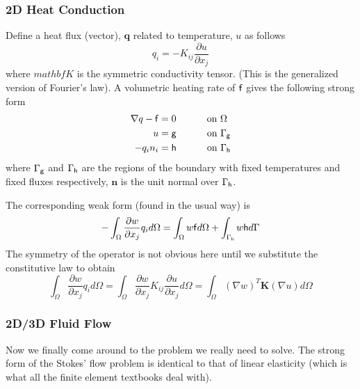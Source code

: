 \documentclass[10pt]{article}
\newcommand{\curly}{\sf }
\begin{document}
	\subsubsection{2D Heat Conduction}
	Define a heat flux (vector), $\mathbf{q}$ related to temperature, $u$ as 	follows
		\begin{equation}
			q_i = -K_{ij} \frac{\partial u}{\partial x_j}
		\end{equation}
	where $mathbf{K}$ is the symmetric conductivity tensor. (This is 
	the generalized version of Fourier's law). A volumetric heating rate of $\curly f$ 
	gives the following strong form
		\begin{equation}
			\begin{split}
				\nabla q - {\curly f} &= 0  \mbox{\hspace{1cm} on $\Omega$} \\
				u & = {\curly g} \mbox{\hspace{1cm} on $\Gamma_{\curly g}$} \\
				-q_i n_i &= {\curly h} \mbox{\hspace{1cm} on $\Gamma_{\curly h}$}
			\end{split}
		\end{equation}
	where $\Gamma_ {\curly g}$ and $\Gamma_{\curly h}$ are the regions of the boundary
	with fixed temperatures and fixed fluxes respectively, $\mathbf{n}$ is the unit normal
	over $\Gamma_{\curly h}$.
	
	The corresponding weak form (found in the usual way) is 
		\begin{equation}
			-\int_\Omega  \frac{\partial w}{\partial x_j} q_i d\Omega = \int_\Omega w {\curly f} d\Omega + \int_{\Gamma_{\curly h}} w{\curly h} d\Gamma
		\end{equation}
	The symmetry of the operator is not obvious here until we substitute the constitutive law to obtain
		\begin{equation}
			\int_\Omega  \frac{\partial w}{\partial x_j} q_i d\Omega =
			 \int_\Omega  \frac{\partial w}{\partial x_j} K_{ij} \frac{\partial u}{\partial x_j} d\Omega = 
			 \int_\Omega  (\nabla w)^T \mathbf{K} (\nabla u) d\Omega
		\end{equation}
		
	\subsubsection{2D/3D Fluid Flow}
	Now we finally come around to the problem we really need to solve.
	The strong form of the Stokes' flow problem is identical to that
	of linear elasticity (which is what all the finite element textbooks
	deal with).
	
\end{document}
